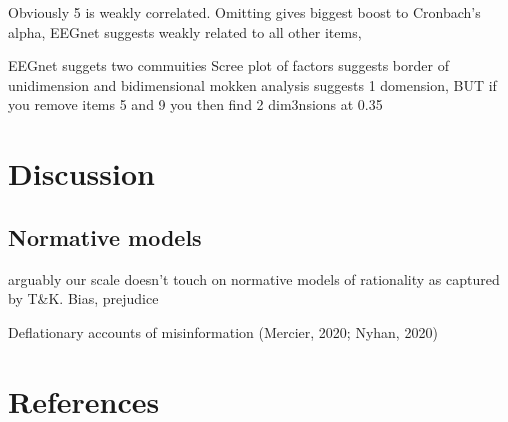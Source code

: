 \documentclass[
  ,jou,floatsintext]{apa6}
\begin{document}
Obviously 5 is weakly correlated. Omitting gives biggest boost to Cronbach's alpha, EEGnet suggests weakly related to all other items,

EEGnet suggets two commuities
Scree plot of factors suggests border of unidimension and bidimensional
mokken analysis suggests 1 domension, BUT if you remove items 5 and 9 you then find 2 dim3nsions at 0.35

\hypertarget{discussion}{%
\section{Discussion}\label{discussion}}

\hypertarget{normative-models}{%
\subsection{Normative models}\label{normative-models}}

arguably our scale doesn't touch on normative models of rationality as captured by T\&K. Bias, prejudice

Deflationary accounts of misinformation (Mercier, 2020; Nyhan, 2020)

\hypertarget{references}{%
\section*{References}\label{references}}
\end{document}
